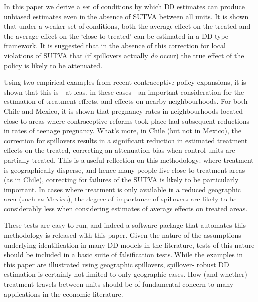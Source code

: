 In this paper we derive a set of conditions by which DD estimates can produce 
unbiased estimates even in the absence of SUTVA between all units.  It is shown
that under a weaker set of conditions, both the average effect on the treated
and the average effect on the `close to treated' can be estimated in a DD-type
framework.  It is suggested that in the absence of this correction for local 
violations of SUTVA that (if spillovers actually \emph{do} occur) the true 
effect of the policy is likely to be attenuated.  

Using two empirical examples from recent contraceptive policy expansions, it is 
shown that this is---at least in these cases---an important consideration for 
the estimation of treatment effects, and effects on nearby neighbourhoods.  For
both Chile and Mexico, it is shown that pregnancy rates in neighbourhoods 
located close to areas where contraceptive reforms took place had subsequent
reductions in rates of teenage pregnancy.  What's more, in Chile (but not in 
Mexico), the correction for spillovers results in a significant reduction in
estimated treatment effects on the treated, correcting an attenuation bias when
control units are partially treated.  This is a useful reflection on this 
methodology: where treatment is geographically disperse, and hence many people
live close to treatment areas (as in Chile), correcting for failures of the
SUTVA is likely to be particularly important.  In cases where treatment is only
available in a reduced geographic area (such as Mexico), the degree of
importance of spillovers are likely to be considerably less when considering
estimates of average effects on treated areas.

These tests are easy to run, and indeed a software package that automates this
methodology is released with this paper.  Given the nature of the assumptions
underlying identification in many DD models in the literature, tests of this 
nature should be included in a basic suite of falsification tests.  While the
examples in this paper are illustrated using geographic spillovers, spillover-%
robust DD estimation is certainly not limited to only geographic cases.  How
(and whether) treatment travels between units should be of fundamental concern 
to many applications in the economic literature.


\newpage

\appendix
